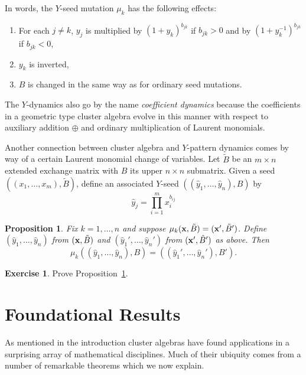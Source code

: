 \documentclass{amsart}
\newtheorem{proposition}[theorem]{Proposition}
\theoremstyle{definition}
\newtheorem{exercise}[theorem]{Exercise}
\theoremstyle{remark}
\numberwithin{equation}{section}
\newcommand{\x}{{\bf x}}
\begin{document}
	In words, the $Y$-seed mutation $\mu_k$ has the following effects:
	\begin{enumerate}
	\item For each $j \neq k$, $y_j$ is multiplied by $(1+y_k)^{b_{jk}}$ if $b_{jk}>0$ and by $(1+y_k^{-1})^{b_{jk}}$ if $b_{jk}<0$,
	\item $y_k$ is inverted,
	\item $B$ is changed in the same way as for ordinary seed mutations.
	\end{enumerate}
	The $Y$-dynamics also go by the name \emph{coefficient dynamics} because the coefficients in a geometric type cluster algebra evolve in this manner with respect to auxiliary addition $\oplus$ and ordinary multiplication of Laurent monomials.
	
	Another connection between cluster algebra and $Y$-pattern dynamics comes by way of a certain Laurent monomial change of variables.  Let $\tilde{B}$ be an $m \times n$ extended exchange matrix with $B$ its upper $n \times n$ submatrix.  Given a seed $((x_1,\ldots, x_m),\tilde{B})$, define an associated $Y$-seed $((\hat{y}_1,\ldots, \hat{y}_n),B)$ by
	\begin{displaymath}
	\hat{y}_j = \prod_{i=1}^m x_i^{b_{ij}}
	\end{displaymath}
	
	\begin{proposition}\label{prop:yhat mutations}
	Fix $k=1,\ldots, n$ and suppose $\mu_k(\x,\tilde{B}) = (\x',\tilde{B}')$.  Define $(\hat{y}_1,\ldots, \hat{y}_n)$ from $(\x,\tilde{B})$ and $(\hat{y}_1',\ldots, \hat{y}_n')$ from $(\x',\tilde{B}')$ as above.  Then 
	\begin{displaymath}
	\mu_k((\hat{y}_1,\ldots, \hat{y}_n), B) = ((\hat{y}_1',\ldots, \hat{y}_n'), B').
	\end{displaymath}
	\end{proposition}

  \begin{exercise}
    Prove Proposition~\ref{prop:yhat mutations}.
  \end{exercise}

\section{Foundational Results}\label{sec:basic_theorems}
  As mentioned in the introduction cluster algebras have found applications in a surprising array of mathematical disciplines.  Much of their ubiquity comes from a number of remarkable theorems which we now explain.  
\end{document}
